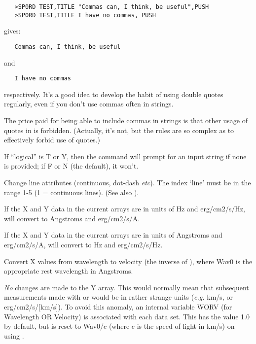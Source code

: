 \begin {description}
\begin{verbatim}
   >SP0RD TEST,TITLE "Commas can, I think, be useful",PUSH
   >SP0RD TEST,TITLE I have no commas, PUSH
\end{verbatim}

gives:

\begin{verbatim}
   Commas can, I think, be useful
\end{verbatim}

and

\begin{verbatim}
   I have no commas
\end{verbatim}

respectively. It's a good idea to develop the habit of using double
quotes regularly, even if you don't use commas often in strings.

The price paid for being able to include commas in strings is that
other usage of quotes in   is forbidden. (Actually, it's not, but
the rules are so complex as to effectively forbid use of quotes.)

If ``logical'' is T or Y, then the command   will prompt for an
input string if none is provided; if F or N (the default), it won't.

Change line attributes (continuous, dot-dash {\em etc}). The index `line'
must be in the range 1-5 (1 = continuous lines). (See also ). 

If the X and Y data in the current arrays are in units of Hz and
\newline erg/cm2/s/Hz,   will convert to Angstroms and
erg/cm2/s/A.

If the X and Y data in the current arrays are in units of Angstroms
and erg/cm2/s/A,   will convert to Hz and erg/cm2/s/Hz.

Convert X values from wavelength to velocity (the inverse of ), 
where Wav0 is the appropriate rest wavelength in Angstroms.

{\em No} changes are made to the Y array. This would normally mean
that subsequent measurements made with   or   would be in rather
strange units ({\em e.g.} km/s, or erg/cm2/s/[km/s]). To avoid this
anomaly, an internal variable WORV (for Wavelength OR Velocity) is
associated with each data set. This has the value 1.0 by default, but
is reset to Wav0/c (where c is the speed of light in km/s) on using
. 


\end{description}

